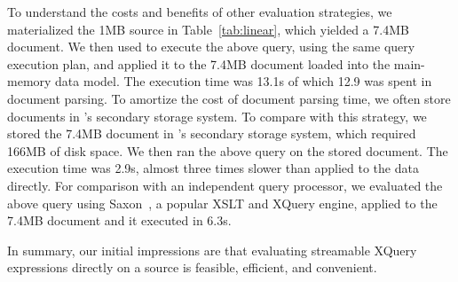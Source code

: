 To understand the costs and benefits of other evaluation strategies,
we materialized the 1MB \pads{} source in Table~\ref{tab:linear},
which yielded a 7.4MB \Xml{} document.  We then used \Galax{} to
execute the above query, using the same query execution plan, and
applied it to the 7.4MB \Xml{} document loaded into the main-memory
data model.  The execution time was 13.1s of which 12.9 was spent in
document parsing.  To amortize the cost of document parsing time, we
often store documents in \Galax{}'s secondary storage system.  To
compare with this strategy, we stored the 7.4MB \Xml{} document in
\Galax{}'s secondary storage system, which required 166MB of disk
space.  We then ran the above query on the stored document.  The
execution time was 2.9s, almost three times slower than \padx{}
applied to the \pads{} data directly.  For comparison with an
independent query processor, we evaluated the above query using
Saxon~\cite{saxon}, a popular XSLT and XQuery engine, applied to the
7.4MB document and it executed in 6.3s.

In summary, our initial impressions are that evaluating
streamable XQuery expressions directly on a \pads{} source is 
feasible, efficient, and convenient. 


